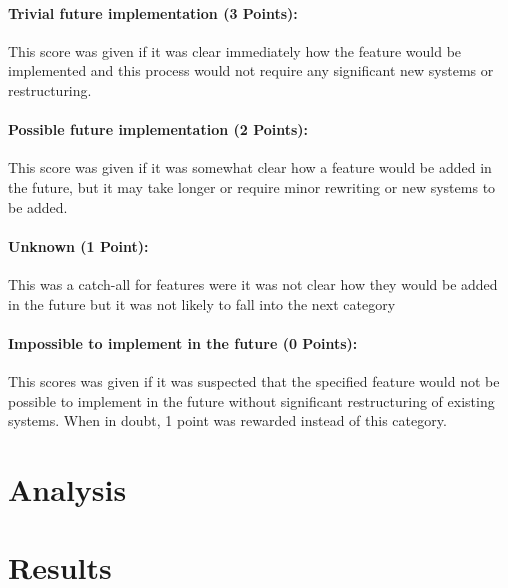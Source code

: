 \paragraph{Trivial future implementation (3 Points):} This score was given if it was clear immediately how the feature would be implemented and this process would not require any significant new systems or restructuring.

\paragraph{Possible future implementation (2 Points):} This score was given if it was somewhat clear how a feature would be added in the future, but it may take longer or require minor rewriting or new systems to be added.

\paragraph{Unknown (1 Point):} This was a catch-all for features were it was not clear how they would be added in the future but it was not likely to fall into the next category

\paragraph{Impossible to implement in the future (0 Points):} This scores was given if it was suspected that the specified feature would not be possible to implement in the future without significant restructuring of existing systems. When in doubt, 1 point was rewarded instead of this category.

\section{Analysis}






\section{Results}


